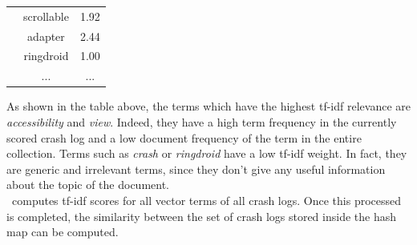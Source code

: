 \begin{table}[htb]
\begin{tabular}{l|c|c|}
                                                                                                            & scrollable                            & 1.92                                  \\ \cline{2-3} 
                                                                                                            & adapter                               & 2.44                                  \\ \cline{2-3} 
                                                                                                            & ringdroid                             & 1.00                                  \\ \cline{2-3} 
                                                                                                            & ...                             & ...                                  
\end{tabular}
\end{table}

As shown in the table above, the terms which have the highest tf-idf relevance are \textit{accessibility} and \textit{view}. Indeed, they have a high term frequency in the currently scored crash log and a low document frequency of the term in the entire collection. 
Terms such as \textit{crash} or \textit{ringdroid} have a low tf-idf weight. In fact, they are generic and irrelevant terms, since they don't give any useful information about the topic of the document. \\
\toolname\ computes tf-idf scores for all vector terms of all crash logs. Once this processed is completed, the similarity between the set of crash logs stored inside the hash map can be computed.
